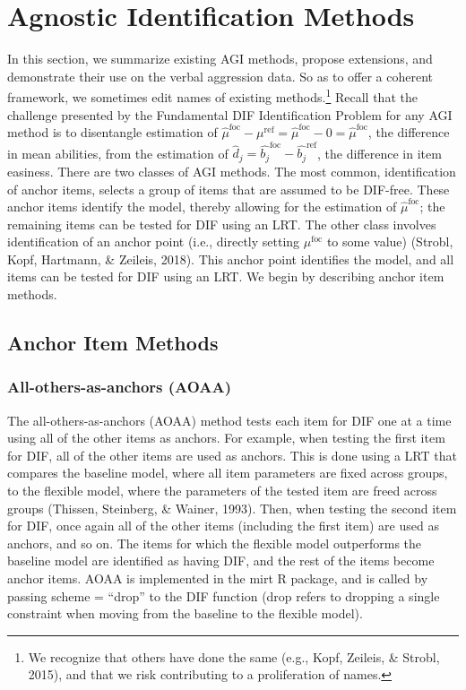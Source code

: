 \documentclass[
  english,
  man,floatsintext]{apa6}
\begin{document}
\hypertarget{aimethods}{%
\section{Agnostic Identification Methods}\label{aimethods}}

In this section, we summarize existing AGI methods, propose extensions, and demonstrate their use on the verbal aggression data. So as to offer a coherent framework, we sometimes edit names of existing methods.\footnote{We recognize that others have done the same (e.g., Kopf, Zeileis, \& Strobl, 2015), and that we risk contributing to a proliferation of names.} Recall that the challenge presented by the Fundamental DIF Identification Problem for any AGI method is to disentangle estimation of \(\hat\mu^\text{foc} - \mu^\text{ref} = \hat\mu^\text{foc} - 0 = \hat\mu^\text{foc}\), the difference in mean abilities, from the estimation of \(\hat d_j = \hat{b_j}^{\text{foc}} - \hat{b_j}^{\text{ref}}\), the difference in item easiness. There are two classes of AGI methods. The most common, identification of anchor items, selects a group of items that are assumed to be DIF-free. These anchor items identify the model, thereby allowing for the estimation of \(\hat\mu^\text{foc}\); the remaining items can be tested for DIF using an LRT. The other class involves identification of an anchor point (i.e., directly setting \(\mu^{\text{foc}}\) to some value) (Strobl, Kopf, Hartmann, \& Zeileis, 2018). This anchor point identifies the model, and all items can be tested for DIF using an LRT. We begin by describing anchor item methods.

\hypertarget{anchor-item-methods}{%
\subsection{Anchor Item Methods}\label{anchor-item-methods}}

\hypertarget{all-others-as-anchors-aoaa}{%
\subsubsection{All-others-as-anchors (AOAA)}\label{all-others-as-anchors-aoaa}}

The all-others-as-anchors (AOAA) method tests each item for DIF one at a time using all of the other items as anchors. For example, when testing the first item for DIF, all of the other items are used as anchors. This is done using a LRT that compares the baseline model, where all item parameters are fixed across groups, to the flexible model, where the parameters of the tested item are freed across groups (Thissen, Steinberg, \& Wainer, 1993). Then, when testing the second item for DIF, once again all of the other items (including the first item) are used as anchors, and so on. The items for which the flexible model outperforms the baseline model are identified as having DIF, and the rest of the items become anchor items. AOAA is implemented in the mirt R package, and is called by passing scheme = ``drop'' to the DIF function (drop refers to dropping a single constraint when moving from the baseline to the flexible model).
\end{document}

